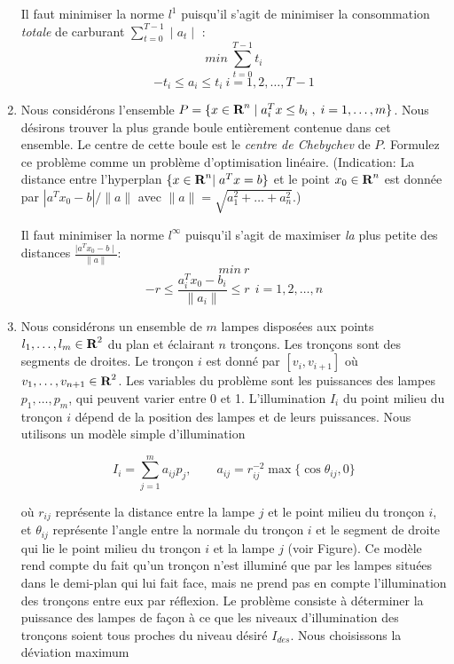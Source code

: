 \begin{enumerate}
    \begin{solution}
      Il faut minimiser la norme $l^{1}$ puisqu'il s'agit de minimiser la consommation \textit{totale} de carburant $\sum_{t=0}^{T-1} \mid a_{t} \mid$ : 
      $$min~\sum_{t=0}^{T-1} t_{i}$$
      $$-t_{i} \le a_{i} \le t_{i}~ i = 1,2,\dots,T-1$$
    \end{solution}



  \item Nous considérons l'ensemble $P=\{ x \in {\mbox{\bf R}}^n \; | \; a_i^T x \leq b_i \; , \;  i=1, \ldots, m \}$. Nous désirons trouver la
    plus grande boule entièrement contenue dans cet ensemble. Le centre de cette boule est  le {\it centre de Chebychev} de $P$.  Formulez
    ce problème comme un problème d'optimisation linéaire. (Indication:  La distance entre l'hyperplan $\{x \in {\mbox{\bf R}}^n | \;  a^Tx=b \}$ et le point $x_0 \in {\mbox{\bf R}}^n$
    est donnée par
    $|a^Tx_0 - b|/\|a\|$ avec $\|a\|=\sqrt{a_1^2+ \ldots + a_n^2}$.)

    \begin{solution}
      Il faut minimiser la norme $l^{\infty}$ puisqu'il s'agit de maximiser \textit{la} plus petite des distances $\frac{\mid a^{T}x_{0} - b \mid}{\|a\|}$: 
      $$ min~r$$
      $$-r \le \frac{a_{i}^{T}x_{0} - b_{i}}{\|a_{i}\|} \le r ~~i = 1,2, \dots, n$$
    \end{solution}





  \item Nous considérons un ensemble de $m$ lampes disposées aux points $l_1, \ldots, l_m \in {\mbox{\bf R}}^2$ du plan et éclairant $n$
    tronçons. Les tronçons sont des segments de droites. Le tronçon $i$ est donné par $[v_i, v_{i+1}]$ où $v_1, \ldots, v_{n+1}
    \in {\mbox{\bf R}}^2$.  Les variables du problème sont les puissances des lampes $p_1, \ldots, p_m$, qui peuvent varier entre 0 et 1.
    L'illumination $I_i$ du point milieu du tronçon $i$ dépend de la position des lampes et de leurs
    puissances. Nous utilisons un modèle simple d'illumination

    $$I_i = \sum_{j=1}^m a_{ij} p_j, \qquad a_{ij}=r_{ij}^{-2} \max \{\cos \theta_{ij}, 0 \}$$

    où $r_{ij}$ représente la distance entre la lampe $j$ et le point milieu du tronçon $i$, et $\theta_{ij}$ représente l'angle
    entre la normale du tronçon $i$ et le segment de droite qui lie le point milieu du tronçon $i$ et la lampe $j$ (voir Figure). Ce
    modèle rend compte du fait qu'un tronçon n'est illuminé que par les lampes situées dans le demi-plan qui lui fait face,
    mais ne prend pas en compte l'illumination des tronçons entre eux par réflexion.  Le problème consiste à déterminer la puissance des lampes de façon à ce
    que les niveaux d'illumination des  tronçons soient tous proches du niveau désiré $I_{des}$. Nous choisissons la déviation maximum


\end{enumerate}
